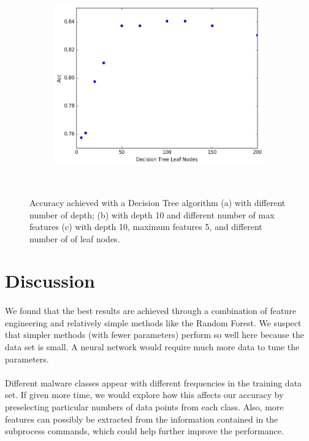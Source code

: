 \documentclass[11pt]{article}
\begin{document}
\begin{figure}[]
\begin{subfigure}[!t]{0.3\textwidth}
        \includegraphics[width=\textwidth]{Plots/DT_leafnodes.png}
    \end{subfigure}\\
        \caption{Accuracy achieved with a Decision Tree algorithm (a) with different number of depth; (b) with depth 10 and different number of max features (c)  with depth 10, maximum features 5, and different number of of leaf nodes.}
            \label{fig:DT}
\end{figure}

\section{Discussion} 
\paragraph{}We found that the best results are achieved through a combination of feature engineering and relatively simple methods like the Random Forest. We suspect that simpler methods (with fewer parameters) perform so well here because the data set is small. A neural network would require much more data to tune the parameters.

\paragraph{}Different malware classes appear with different frequencies in the training data set. If given more time, we would explore how this affects our accuracy by preselecting particular numbers of data points from each class. Also, more features can possibly be extracted from the information contained in the subprocess commands, which could help further improve the performance. 
\end{document}
